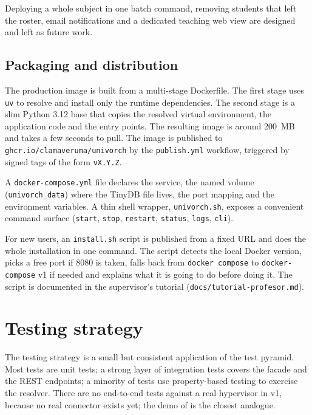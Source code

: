 Deploying a whole subject in one batch command, removing students
that left the roster, email notifications and a dedicated teaching
web view are designed and left as future work.

\subsection{Packaging and distribution}

The production image is built from a multi-stage Dockerfile. The
first stage uses \texttt{uv} to resolve and install only the
runtime dependencies. The second stage is a slim Python 3.12 base
that copies the resolved virtual environment, the application code
and the entry points. The resulting image is around 200~MB and
takes a few seconds to pull. The image is published to
\texttt{ghcr.io/clamaveruma/univorch} by the \texttt{publish.yml}
workflow, triggered by signed tags of the form \texttt{vX.Y.Z}.

A \texttt{docker-compose.yml} file declares the service, the
named volume (\texttt{univorch\_data}) where the TinyDB file
lives, the port mapping and the environment variables. A thin
shell wrapper, \texttt{univorch.sh}, exposes a convenient command
surface (\texttt{start}, \texttt{stop}, \texttt{restart},
\texttt{status}, \texttt{logs}, \texttt{cli}).

For new users, an \texttt{install.sh} script is published from a
fixed URL and does the whole installation in one command. The
script detects the local Docker version, picks a free port if 8080
is taken, falls back from \texttt{docker compose} to
\texttt{docker-compose} v1 if needed and explains what it is going
to do before doing it. The script is documented in the supervisor's
tutorial (\texttt{docs/tutorial-profesor.md}).

\section{Testing strategy}
\label{sec:pruebas}

The testing strategy is a small but consistent application of the
test pyramid. Most tests are unit tests; a strong layer of
integration tests covers the facade and the REST endpoints; a
minority of tests use property-based testing to exercise the
resolver. There are no end-to-end tests against a real hypervisor
in v1, because no real connector exists yet; the demo of
 is the closest analogue.

